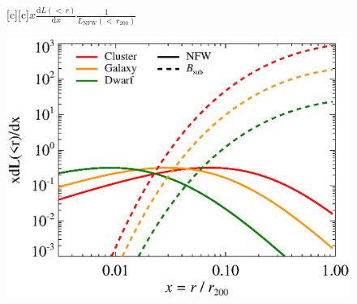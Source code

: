 \documentclass[dvips]{article}
\begin{document}
\pagestyle{empty}

\newcommand{\size}{\Large}%

\begin{figure}
  [c][c]{\size $x\frac{\displaystyle \mathrm{d}L(<\,r)}{\displaystyle \mathrm{d}x}\frac{\displaystyle  1}{L_\mathrm{NFW}(\displaystyle<\,r_{200})}$}
  
    \includegraphics[width=\textwidth]{emissiv.sub_raw.eps}
\end{figure}
\end{document}
